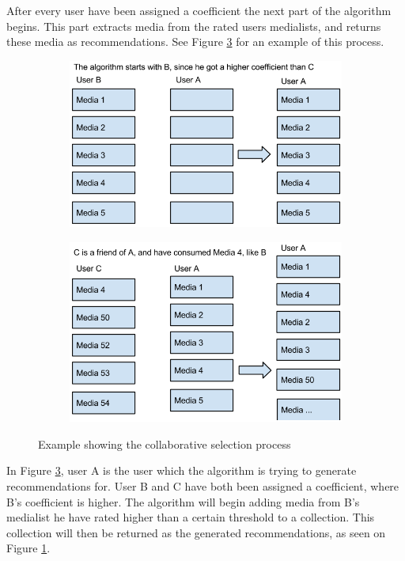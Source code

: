 After every user have been assigned a coefficient the next part of the algorithm begins. This part extracts media from the rated users medialists, and returns these media as recommendations. See Figure \ref{CollaEx} for an example of this process.

\begin{figure}[H]
\centering
\begin{subfigure}{.5\textwidth}
  \centering
  \includegraphics[width=.9\linewidth]{Images/CollaborativeRecExample1.png}
  \caption{}
  \label{fig:collarec1}
\end{subfigure}%
\begin{subfigure}{.5\textwidth}
  \centering
  \includegraphics[width=.9\linewidth]{Images/CollaborativeRecExample2.png}
  \caption{}
  \label{fig:collarec2}
\end{subfigure}
\caption{Example showing the collaborative selection process}
\label{CollaEx}
\end{figure}

In Figure \ref{CollaEx}, user A is the user which the algorithm is trying to generate recommendations for. User B and C have both been assigned a coefficient, where B’s coefficient is higher. The algorithm will begin adding media from B’s medialist he have rated higher than a certain threshold to a collection. This collection will then be returned as the generated recommendations, as seen on Figure \ref{fig:collarec1}.

